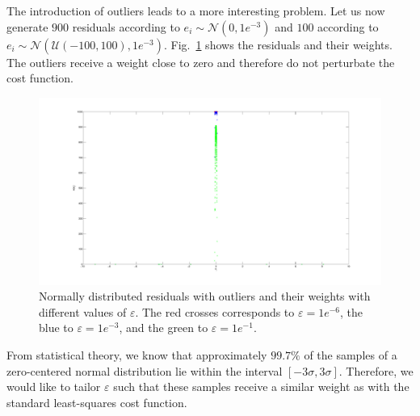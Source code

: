 \documentclass[12pt]{article}
\begin{document}
        The introduction of outliers leads to a more interesting problem. Let
        us now generate $900$ residuals according to
        $e_i\sim\mathcal{N}(0,1e^{-3})$ and $100$ according to
        $e_i\sim\mathcal{N}(\mathcal{U}(-100,100),1e^{-3})$. Fig.~\ref{fig:bz2}
        shows the residuals and their weights. The outliers receive a weight
        close to zero and therefore do not perturbate the cost function.

        \begin{figure}[t]
          \centering
          \includegraphics[scale=0.3]{bz2.pdf}
          \caption{Normally distributed residuals with outliers and their
            weights with
            different values of
            $\varepsilon$. The red crosses corresponds to $\varepsilon=1e^{-6}$,
            the blue to $\varepsilon=1e^{-3}$, and the green to
            $\varepsilon=1e^{-1}$.}
          \label{fig:bz2}
        \end{figure}

        From statistical theory, we know that approximately $99.7\%$ of the
        samples of a zero-centered normal distribution lie within the interval
        $[-3\sigma,3\sigma]$. Therefore, we would like to tailor $\varepsilon$
        such that these samples receive a similar weight as with the standard
        least-squares cost function.
\end{document}
